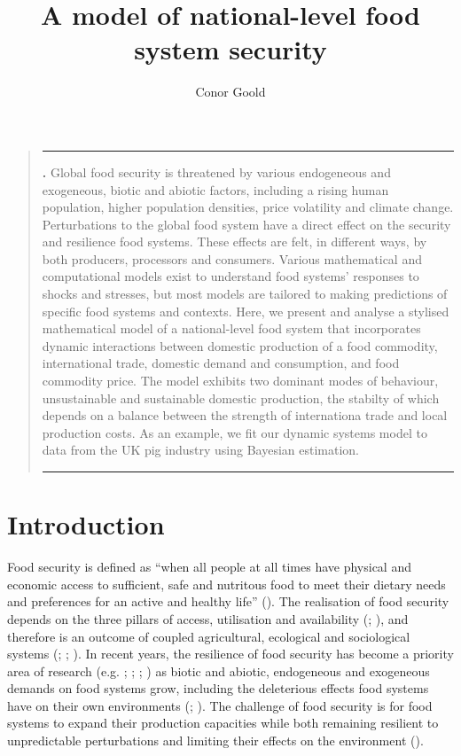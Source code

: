 \documentclass[12pt]{article}
\title{A model of national-level food system security}
\author[1]{Conor Goold}
\affil[1]{Faculty of Biological Sciences, University of Leeds, LS2 9JT, UK}
\date{}
\renewenvironment{abstract}
{\begin{quote}
\small
\noindent \rule{\linewidth}{.5pt}\par{\bfseries \abstractname.}}
{\medskip\noindent \rule{\linewidth}{.5pt}
\end{quote}
}
\begin{document}
\linenumbers
\modulolinenumbers[5]

\maketitle
\begin{abstract}
  Global food security is threatened by various endogeneous and exogeneous, biotic and abiotic factors, including a rising human population, higher population densities, price volatility and climate change. Perturbations to the global food system have a direct effect on the security and resilience food systems. These effects are felt, in different ways, by both producers, processors and consumers. Various mathematical and computational models exist to understand food systems' responses to shocks and stresses, but most models are tailored to making predictions of specific food systems and contexts. Here, we present and analyse a stylised mathematical model of a national-level food system that incorporates dynamic interactions between domestic production of a food commodity, international trade, domestic demand and consumption, and food commodity price. The model exhibits two dominant modes of behaviour, unsustainable and sustainable domestic production, the stabilty of which depends on a balance between the strength of internationa trade and local production costs. As an example, we fit our dynamic systems model to data from the UK pig industry using Bayesian estimation.\\
\end{abstract}

\newpage
\tableofcontents

\section{Introduction}
Food security is defined as ``when all people at all times have physical and economic access to sufficient, safe and nutritous food to meet their dietary needs and preferences for an active and healthy life'' (\cite{FAO1996}). The realisation of food security depends on the three pillars of access, utilisation and availability (\cite{maxwell1996}; \cite{barrett2010}), and therefore is an outcome of coupled agricultural, ecological and sociological systems (\cite{hammond2012}; \cite{ericksen2008}; \cite{ingram2011}). In recent years, the resilience of food security has become a priority area of research (e.g. \cite{nystrom2019}; \cite{tendall2015}; \cite{bene2016}; \cite{seekell2017}) as biotic and abiotic, endogeneous and exogeneous demands on food systems grow, including the deleterious effects food systems have on their own environments (\cite{springmann2018}; \cite{strzepek2010}). The challenge of food security is for food systems to expand their production capacities while both remaining resilient to unpredictable perturbations and limiting their effects on the environment (\cite{ericksen2010}).
\end{document}

